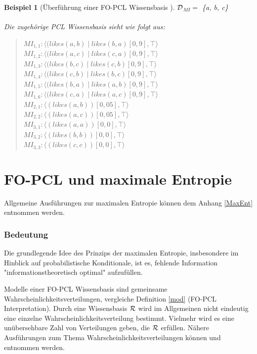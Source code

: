 \documentclass[a4paper, 11pt]{book}
\newtheorem{Bsp}{Beispiel}[section]
\begin{document}
\begin{Bsp}[Überführung einer FO-PCL Wissensbasis ]
	$ \cal{D} $$_{MI}  =$ \{a, b, c\} \\
	\\
	Die zugehörige PCL Wissensbasis sieht wie folgt aus:
	\begin{quote}
	$ MI_{1,1}: \langle (likes(a, b) \mid likes(b, a)[0,9], \top \rangle $\\
	$ MI_{1,2} : \langle (likes(a, c) \mid likes(c, a)[0,9], \top \rangle$\\
	$ MI_{1,3}: \langle (likes(b, c) \mid likes(c, b)[0,9], \top \rangle $\\
	$ MI_{1,4} : \langle (likes(c, b) \mid likes(b, c)[0,9], \top \rangle$\\
	$ MI_{1,5} : \langle (likes(b, a) \mid likes(a, b)[0,9], \top \rangle$\\
	$ MI_{1,6} : \langle (likes(c, a) \mid likes(a, c)[0,9], \top \rangle$\\		
	$ MI_{2,1} : \langle (likes(a, b))[0,05], \top \rangle$\\
	$ MI_{2,2} : \langle (likes(a, c))[0,05], \top \rangle$\\
	$ MI_{3,1} : \langle (likes(a, a))[0,0], \top \rangle$\\
	$ MI_{3,2} : \langle (likes(b, b))[0,0], \top \rangle$\\
	$ MI_{3,3} : \langle (likes(c, c))[0,0], \top \rangle$\\

	\end{quote}

	
\end{Bsp}

\section{FO-PCL und maximale Entropie}   \label{Fo-PCL-MaxEnt}
Allgemeine Ausführungen zur maximalen Entropie können dem Anhang \ref{MaxEnt} entnommen werden.
\subsubsection{Bedeutung}

Die grundlegende Idee des Prinzips der maximalen Entropie, insbesondere im Hinblick auf probabilistische Konditionale, ist es, fehlende Information "{}informationstheoretisch optimal"{} aufzufüllen.

Modelle einer FO-PCL Wissensbasis  sind gemeinsame Wahrscheinlichkeitsverteilungen, vergleiche Definition \ref{mod} (FO-PCL Interpretation).
Durch eine Wissensbasis $ \cal R $ wird im Allgemeinen nicht eindeutig eine einzelne Wahrscheinlichkeitsverteilung bestimmt. Vielmehr wird es eine unübersehbare Zahl von Verteilungen geben, die $ \cal R $ erfüllen.
Nähere Ausführungen zum Thema Wahrscheinlichkeitsverteilungen können \cite[Anhang A, S. 437ff]{BKI08} und \cite[Kap. 5, S. 14ff]{Fis10} entnommen werden.
\end{document}
